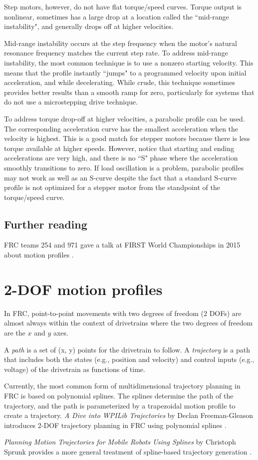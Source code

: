 Step motors, however, do not have flat torque/speed curves. Torque output is
nonlinear, sometimes has a large drop at a location called the ``mid-range
instability", and generally drops off at higher velocities.

Mid-range instability occurs at the step frequency when the motor's natural
resonance frequency matches the current step rate. To address mid-range
instability, the most common technique is to use a nonzero starting velocity.
This means that the profile instantly ``jumps" to a programmed velocity upon
initial acceleration, and while decelerating. While crude, this technique
sometimes provides better results than a smooth ramp for zero, particularly for
\glspl{system} that do not use a microstepping drive technique.

To address torque drop-off at higher velocities, a parabolic profile can be
used. The corresponding acceleration curve has the smallest acceleration when
the velocity is highest. This is a good match for stepper motors because there
is less torque available at higher speeds. However, notice that starting and
ending accelerations are very high, and there is no ``S" phase where the
acceleration smoothly transitions to zero. If load oscillation is a problem,
parabolic profiles may not work as well as an S-curve despite the fact that a
standard S-curve profile is not optimized for a stepper motor from the
standpoint of the torque/speed curve.

\subsection{Further reading}

FRC teams 254 and 971 gave a talk at FIRST World Championships in 2015 about
motion profiles \cite{bib:motion_profiles}.

\section{2-DOF motion profiles}

In FRC, point-to-point movements with two degrees of freedom ($2$ DOFs) are
almost always within the context of drivetrains where the two degrees of freedom
are the $x$ and $y$ axes.

A \textit{path} is a set of (x, y) points for the drivetrain to follow. A
\textit{trajectory} is a path that includes both the states (e.g., position and
velocity) and control inputs (e.g., voltage) of the drivetrain as functions of
time.

Currently, the most common form of multidimensional trajectory planning in FRC
is based on polynomial splines. The splines determine the path of the
trajectory, and the path is parameterized by a trapezoidal motion profile to
create a trajectory. \textit{A Dive into WPILib Trajectories} by Declan
Freeman-Gleason introduces 2-DOF trajectory planning in FRC using polynomial
splines \cite{bib:a_dive_into_wpilib_trajectories}.

\textit{Planning Motion Trajectories for Mobile Robots Using Splines} by
Christoph Sprunk provides a more general treatment of spline-based trajectory
generation \cite{bib:spline_traj_sprunk}.
